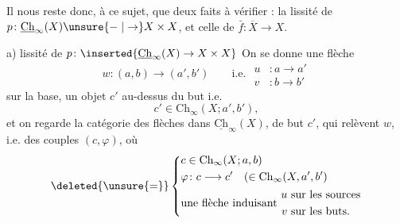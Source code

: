 Il nous reste donc, à ce sujet, que deux faits à
vérifier : la lissité de $p\colon\underline{\mathrm{Ch}}_{\infty}(X)\unsure{\relbar|\to}X\times X$,
et celle de $\bar f\colon\overline X\longrightarrow X$.

a) lissité de $p\colon\inserted{\underline{\mathrm{Ch}}_{\infty}(X)\to X\times X}$ On se donne une flèche
\[
w\colon(a,b)\longrightarrow(a',b')\qquad
\text{i.e. }\begin{aligned}u&\colon a\to a'\\v&\colon b\to b'\end{aligned}
\]
sur la base, un objet $c'$ au-dessus du but
i.e.
\[
c'\in\mathrm{Ch}_{\infty}(X;a',b'),
\]
et on regarde la catégorie des flèches dans
$\underline{\mathrm{Ch}}_{\infty}(X)$, de but $c'$, qui relèvent $w$,
i.e.  des couples \deleted{\unsure{$\varphi$}} $(c,\varphi)$, où
\[
\deleted{\unsure{=}}\left\{\begin{aligned}
&c\in\mathrm{Ch}_{\infty}(X;a,b)\\
&\varphi\colon c\longrightarrow c'\quad(\in\mathrm{Ch}_{\infty}(X,a',b')\\
&\text{une flèche induisant }\begin{aligned}u&\ \text{sur les sources}\\v&\ \text{sur les buts.}\end{aligned}
\end{aligned}\right.
\]
